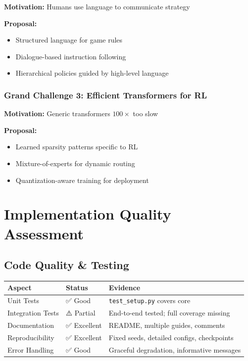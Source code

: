 \documentclass[12pt,a4paper,openany]{report}
\begin{document}
\textbf{Motivation:} Humans use language to communicate strategy

\textbf{Proposal:}
\begin{itemize}
    \item Structured language for game rules
    \item Dialogue-based instruction following
    \item Hierarchical policies guided by high-level language
\end{itemize}

\subsection{Grand Challenge 3: Efficient Transformers for RL}

\textbf{Motivation:} Generic transformers $100\times$ too slow

\textbf{Proposal:}
\begin{itemize}
    \item Learned sparsity patterns specific to RL
    \item Mixture-of-experts for dynamic routing
    \item Quantization-aware training for deployment
\end{itemize}

\chapter{Implementation Quality Assessment}

\section{Code Quality \& Testing}

\begin{table}[H]
\centering
\small
\begin{tabular}{lll}
\toprule
Aspect & Status & Evidence \\
\midrule
Unit Tests & ✅ Good & \texttt{test\_setup.py} covers core \\
Integration Tests & ⚠️ Partial & End-to-end tested; full coverage missing \\
Documentation & ✅ Excellent & README, multiple guides, comments \\
Reproducibility & ✅ Excellent & Fixed seeds, detailed configs, checkpoints \\
Error Handling & ✅ Good & Graceful degradation, informative messages \\
\bottomrule
\end{tabular}
\end{table}
\end{document}
